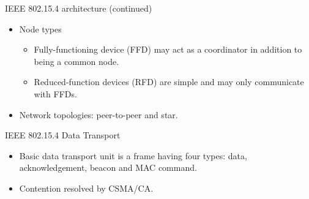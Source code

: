 \documentclass{beamer}
\begin{document}
\begin{frame}{IEEE 802.15.4 architecture (continued)}
  \begin{itemize}
    \item Node types  
      \begin{itemize}
      \item Fully-functioning device (FFD) may act as a coordinator in addition
      to being a common node. 
      \item Reduced-function devices (RFD) are simple and may only communicate
      with FFDs.
    \end{itemize}
    \item Network topologies: peer-to-peer and star.
  \end{itemize}
\end{frame}

\begin{frame}{IEEE 802.15.4 Data Transport}
  \begin{itemize}
    \item Basic data transport unit is a frame having four types: data, 
    acknowledgement, beacon and MAC command.
    \item Contention resolved by CSMA/CA.
  \end{itemize}
\end{frame}
\end{document}
